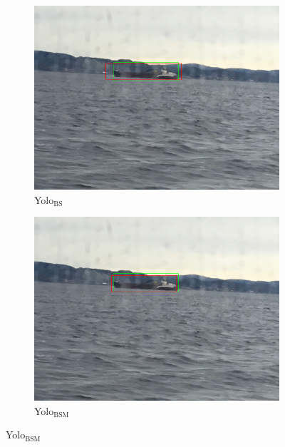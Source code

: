 \begin{figure}[h!]
\begin{subfigure}{.5\textwidth}
  \centering
  \includegraphics[width=0.75\linewidth]{results/case_tr_moor/yolo12/yolo1/big/IMG_2537.jpg}
  \caption{Yolo$_{\text{BS}}$}
\end{subfigure}%
\begin{subfigure}{.5\textwidth}
  \centering
  \includegraphics[width=.75\linewidth]{results/case_tr_moor/yolo12/yolo2/big/IMG_2537.jpg}
  \caption{Yolo$_{\text{BSM}}$}
\end{subfigure}


\end{figure}
